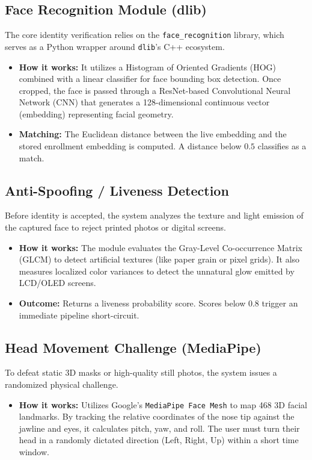 \documentclass[12pt,a4paper]{article}
\begin{document}
\subsection{Face Recognition Module (dlib)}
The core identity verification relies on the \texttt{face\_recognition} library, which serves as a Python wrapper around \texttt{dlib}'s C++ ecosystem.
\begin{itemize}
    \item \textbf{How it works:} It utilizes a Histogram of Oriented Gradients (HOG) combined with a linear classifier for face bounding box detection. Once cropped, the face is passed through a ResNet-based Convolutional Neural Network (CNN) that generates a 128-dimensional continuous vector (embedding) representing facial geometry. 
    \item \textbf{Matching:} The Euclidean distance between the live embedding and the stored enrollment embedding is computed. A distance below $0.5$ classifies as a match.
\end{itemize}

\subsection{Anti-Spoofing / Liveness Detection}
Before identity is accepted, the system analyzes the texture and light emission of the captured face to reject printed photos or digital screens.
\begin{itemize}
    \item \textbf{How it works:} The module evaluates the Gray-Level Co-occurrence Matrix (GLCM) to detect artificial textures (like paper grain or pixel grids). It also measures localized color variances to detect the unnatural glow emitted by LCD/OLED screens.
    \item \textbf{Outcome:} Returns a liveness probability score. Scores below $0.8$ trigger an immediate pipeline short-circuit.
\end{itemize}

\subsection{Head Movement Challenge (MediaPipe)}
To defeat static 3D masks or high-quality still photos, the system issues a randomized physical challenge.
\begin{itemize}
    \item \textbf{How it works:} Utilizes Google's \texttt{MediaPipe Face Mesh} to map 468 3D facial landmarks. By tracking the relative coordinates of the nose tip against the jawline and eyes, it calculates pitch, yaw, and roll. The user must turn their head in a randomly dictated direction (Left, Right, Up) within a short time window.
\end{itemize}
\end{document}
